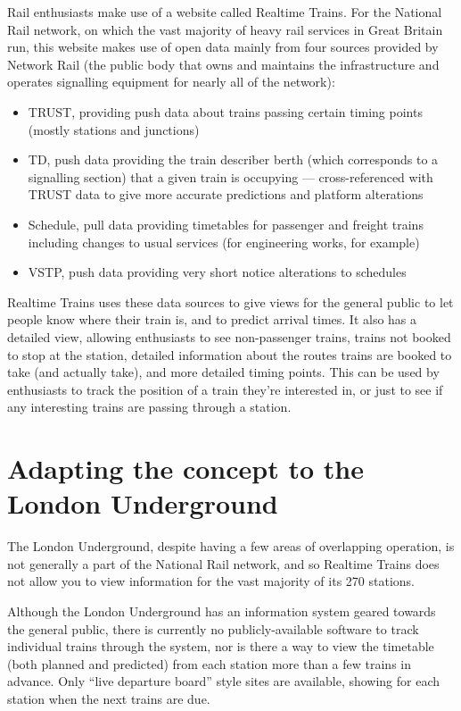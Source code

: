 \documentclass[a4paper,12pt,twoside]{report}
\begin{document}
Rail enthusiasts make use of a website called Realtime Trains. For the National
Rail network, on which the vast majority of heavy rail services in Great
Britain run, this website makes use of open data mainly from four sources
provided by Network Rail (the public body that owns and maintains the
infrastructure and operates signalling equipment for nearly all of the
network)\cite{RTTData}:

\begin{itemize}
  \item TRUST, providing push data about trains passing certain timing points
    (mostly stations and junctions)
  \item TD, push data providing the train describer berth (which corresponds to
    a signalling section) that a given train is occupying --- cross-referenced
    with TRUST data to give more accurate predictions and platform alterations
  \item Schedule, pull data providing timetables for passenger and freight
    trains including changes to usual services (for engineering works, for
    example)
  \item VSTP, push data providing very short notice alterations to schedules
\end{itemize}

Realtime Trains uses these data sources to give views for the general public to
let people know where their train is, and to predict arrival times. It also has
a detailed view, allowing enthusiasts to see non-passenger trains, trains not
booked to stop at the station, detailed information about the routes trains are
booked to take (and actually take), and more detailed timing points. This can
be used by enthusiasts to track the position of a train they're interested in,
or just to see if any interesting trains are passing through a station.

\section{Adapting the concept to the London Underground}

The London Underground, despite having a few areas of overlapping operation, is
not generally a part of the National Rail network, and so Realtime Trains does
not allow you to view information for the vast majority of its 270 stations.

Although the London Underground has an information system geared towards the
general public, there is currently no publicly-available software to track
individual trains through the system, nor is there a way to view the timetable
(both planned and predicted) from each station more than a few trains in
advance. Only ``live departure board'' style sites are available, showing for
each station when the next trains are due.
\end{document}
